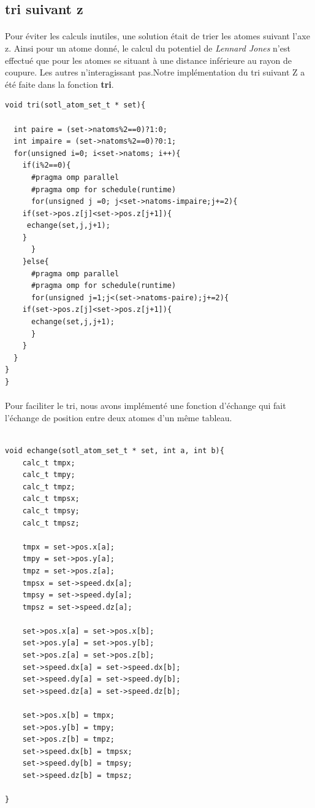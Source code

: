 \documentclass[a4paper,11pt]{report}
\begin{document}
\subsection{tri suivant z }
\paragraph{}
Pour éviter les calculs inutiles, une solution était de trier les atomes suivant l'axe z. Ainsi pour un atome donné, le calcul du potentiel de \textit{Lennard Jones} n'est effectué que pour les atomes se situant à une distance inférieure au rayon de coupure. Les autres n'interagissant pas.Notre implémentation du tri  suivant Z a été faite dans la fonction \textbf{tri}.
\newline
\begin{lstlisting}[style=CStyle]
void tri(sotl_atom_set_t * set){

  int paire = (set->natoms%2==0)?1:0;
  int impaire = (set->natoms%2==0)?0:1;
  for(unsigned i=0; i<set->natoms; i++){
    if(i%2==0){
      #pragma omp parallel
      #pragma omp for schedule(runtime)
      for(unsigned j =0; j<set->natoms-impaire;j+=2){
	if(set->pos.z[j]<set->pos.z[j+1]){
	 echange(set,j,j+1);
	}
      }
    }else{
      #pragma omp parallel 
      #pragma omp for schedule(runtime)
      for(unsigned j=1;j<(set->natoms-paire);j+=2){
	if(set->pos.z[j]<set->pos.z[j+1]){
	  echange(set,j,j+1);
      }
    }
  }
}
}

\end{lstlisting}

\paragraph{}
Pour faciliter le tri, nous avons implémenté une fonction d'échange qui fait l'échange de position entre deux atomes d'un même  tableau.
\newline
\begin{lstlisting}[style=CStyle]

void echange(sotl_atom_set_t * set, int a, int b){
	calc_t tmpx;
	calc_t tmpy;	
	calc_t tmpz;
	calc_t tmpsx;
	calc_t tmpsy;
	calc_t tmpsz;

	tmpx = set->pos.x[a];
	tmpy = set->pos.y[a];
	tmpz = set->pos.z[a];
	tmpsx = set->speed.dx[a];
	tmpsy = set->speed.dy[a];
	tmpsz = set->speed.dz[a];

	set->pos.x[a] = set->pos.x[b];
	set->pos.y[a] = set->pos.y[b];
	set->pos.z[a] = set->pos.z[b];
	set->speed.dx[a] = set->speed.dx[b];
	set->speed.dy[a] = set->speed.dy[b];
	set->speed.dz[a] = set->speed.dz[b];

	set->pos.x[b] = tmpx;
	set->pos.y[b] = tmpy;
	set->pos.z[b] = tmpz;
	set->speed.dx[b] = tmpsx;
	set->speed.dy[b] = tmpsy;
	set->speed.dz[b] = tmpsz;

}
\end{lstlisting}
\end{document}
